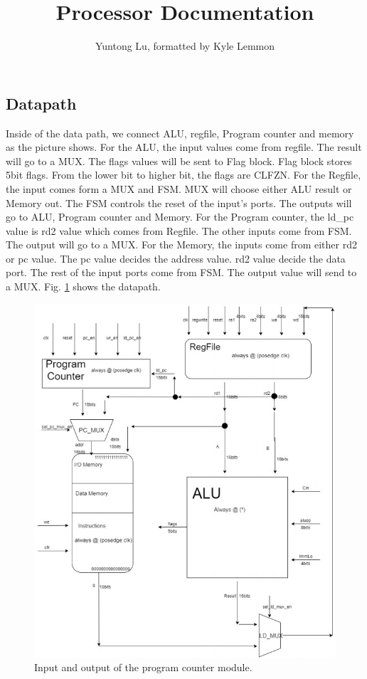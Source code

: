 \documentclass[../ProjectDocumentation.tex]{subfiles}
\title{\textbf{Processor Documentation}}
\author{Yuntong Lu, formatted by Kyle Lemmon}
\date{}
\begin{document}
\maketitle

\subsection{Datapath}
Inside of the data path, we connect ALU, regfile, Program counter and memory as the picture
shows.
For the ALU, the input values come from regfile. The result will go to a MUX. The flags values
will be sent to Flag block. Flag block stores 5bit flags. From the lower bit to higher bit, the flags
are CLFZN.
For the Regfile, the input comes form a MUX and FSM. MUX will choose either ALU result or
Memory out. The FSM controls the reset of the input’s ports. The outputs will go to ALU,
Program counter and Memory.
For the Program counter, the ld\_pc value is rd2 value which comes from Regfile. The other
inputs come from FSM. The output will go to a MUX.
For the Memory, the inputs come from either rd2 or pc value. The pc value decides the address
value. rd2 value decide the data port. The rest of the input ports come from FSM. The output
value will send to a MUX. Fig. \ref{fig:datapath} shows the datapath.
\begin{figure}
\centering
\includegraphics[width=12cm]{datapath}
\caption{Input and output of the program counter module.}
\label{fig:datapath}
\end{figure}
\end{document}
